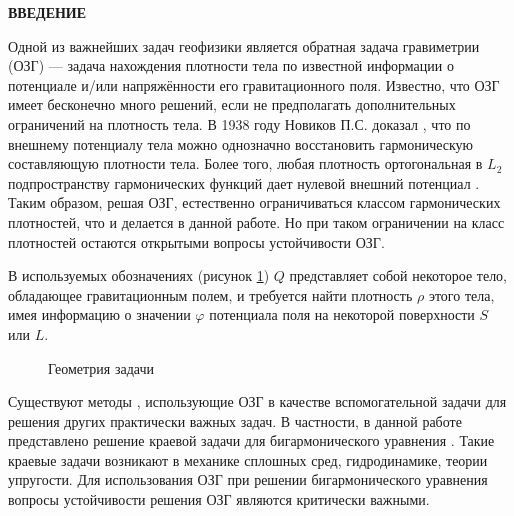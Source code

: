 \documentclass[a4paper]{article}
\begin{document}
\begin{center}
  {\bf ВВЕДЕНИЕ}
\end{center}

Одной из важнейших задач геофизики является  обратная задача гравиметрии (ОЗГ) --- задача нахождения
плотности тела по известной информации о потенциале и/или напряжённости его гравитационного поля. Известно, что  ОЗГ имеет бесконечно много решений, если не предполагать дополнительных ограничений на плотность тела. В 1938 году Новиков П.С. доказал \cite{nov}, что по внешнему потенциалу тела можно однозначно восстановить гармоническую составляющую плотности тела. Более того, любая плотность ортогональная в $L_2$ подпространству гармонических функций дает нулевой внешний потенциал  \cite{nov}.  Таким образом, решая ОЗГ, естественно ограничиваться классом гармонических плотностей, что и делается в данной работе. Но при таком ограничении на класс плотностей остаются открытыми вопросы устойчивости ОЗГ.

В используемых обозначениях (рисунок \ref{first}) $Q$ представляет собой некоторое тело,
обладающее гравитационным полем, и требуется найти плотность $\rho$ этого тела,
имея информацию о значении $\varphi$ потенциала поля на некоторой поверхности $S$ или $L$.
\begin{figure}[h!]
  \noindent{}
  \caption{Геометрия задачи}
  \label{first}
\end{figure}

Существуют методы \cite{lezh,lezh2}, использующие ОЗГ в качестве вспомогательной задачи для решения других практически важных задач.
В частности, в данной работе представлено решение краевой задачи для бигармонического уравнения  \cite{lezh,lezh2}. Такие краевые задачи возникают в механике сплошных сред, гидродинамике,
теории упругости. Для использования ОЗГ при решении бигармонического уравнения вопросы устойчивости решения ОЗГ являются критически важными. 
\end{document}
